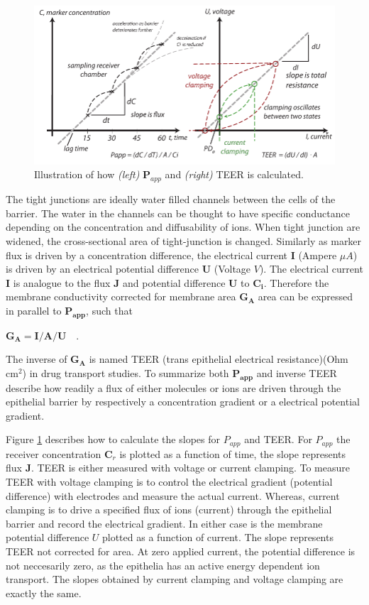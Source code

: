 \begin{figure}[!htpb]
\includegraphics[width=\textwidth,height=\textheight,keepaspectratio]{graphics/samplingClamping2.pdf}
\caption{Illustration of how \textit{(left)} $\bm{P}_{app}$ and \textit{(right)} TEER is calculated.}
\label{meassure_TEERPapp}
\end{figure}

The tight junctions are ideally water filled channels between the cells of the barrier. The water in the channels can be thought to have specific conductance depending on the concentration and diffusability of ions. When tight junction are widened, the cross-sectional area of tight-junction is changed. Similarly as marker flux is driven by a concentration difference, the electrical current $\bm{I}$ (Ampere $\mu A$) is driven by an electrical potential difference $\bm{U}$ (Voltage $V$). The electrical current $\bm{I}$ is analogue to the flux $\bm{J}$ and potential difference $\bm{U}$ to $\bm{C_i}$. Therefore the membrane conductivity corrected for membrane area $\bm{G_A}$ area can be expressed in parallel to $\bm{P_{app}}$, such that

$\bm{G_A} = \bm{I} / \bm{A} / \bm{U} \quad .$

The inverse of $\bm{G_A}$ is named TEER (trans epithelial electrical resistance)(Ohm cm$^2$) in drug transport studies. To summarize both $\bm{P_{app}}$ and inverse TEER describe how readily a flux of either molecules or ions are driven through the epithelial barrier by respectively a concentration gradient or a electrical potential gradient. 

Figure \ref{meassure_TEERPapp} describes how to calculate the slopes for $P_{app}$ and TEER. For $P_{app}$  the receiver concentration $\bm{C}_r$ is plotted as a function of time, the slope represents flux $\bm{J}$. TEER is either measured with voltage or current clamping. To measure TEER with voltage clamping is to control the electrical gradient (potential difference) with electrodes and measure the actual current. Whereas, current clamping is to drive a specified flux of ions (current) through the epithelial barrier and record the electrical gradient. In either case is the membrane potential difference $U$ plotted as a function of current. The slope represents TEER not corrected for area. At zero applied current, the potential difference is not neccesarily zero, as the epithelia has an active energy dependent ion transport. The slopes obtained by current clamping and voltage clamping are exactly the same.


